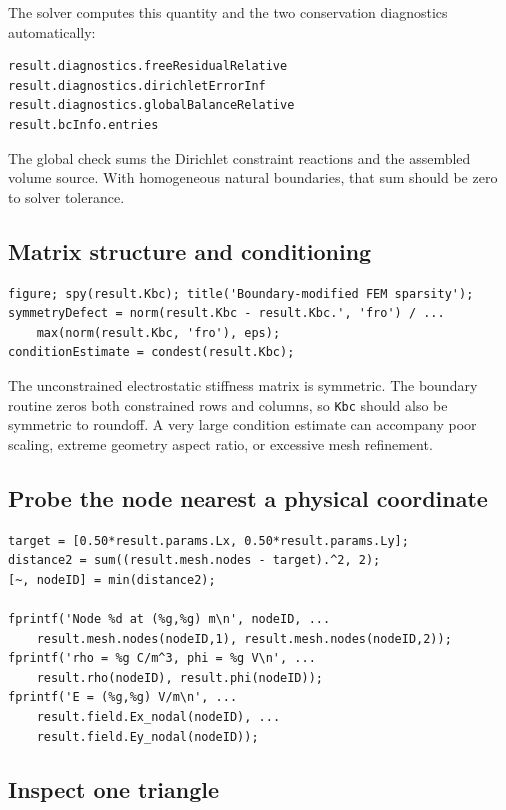 \documentclass[11pt]{article}
\begin{document}
The solver computes this quantity and the two conservation diagnostics automatically:
\begin{lstlisting}[style=projectmatlab]
result.diagnostics.freeResidualRelative
result.diagnostics.dirichletErrorInf
result.diagnostics.globalBalanceRelative
result.bcInfo.entries
\end{lstlisting}
The global check sums the Dirichlet constraint reactions and the assembled volume source. With homogeneous natural boundaries, that sum should be zero to solver tolerance.

\subsection{Matrix structure and conditioning}

\begin{lstlisting}[style=projectmatlab]
figure; spy(result.Kbc); title('Boundary-modified FEM sparsity');
symmetryDefect = norm(result.Kbc - result.Kbc.', 'fro') / ...
    max(norm(result.Kbc, 'fro'), eps);
conditionEstimate = condest(result.Kbc);
\end{lstlisting}
The unconstrained electrostatic stiffness matrix is symmetric. The boundary routine zeros both constrained rows and columns, so \texttt{Kbc} should also be symmetric to roundoff. A very large condition estimate can accompany poor scaling, extreme geometry aspect ratio, or excessive mesh refinement.

\subsection{Probe the node nearest a physical coordinate}

\begin{lstlisting}[style=projectmatlab]
target = [0.50*result.params.Lx, 0.50*result.params.Ly];
distance2 = sum((result.mesh.nodes - target).^2, 2);
[~, nodeID] = min(distance2);

fprintf('Node %d at (%g,%g) m\n', nodeID, ...
    result.mesh.nodes(nodeID,1), result.mesh.nodes(nodeID,2));
fprintf('rho = %g C/m^3, phi = %g V\n', ...
    result.rho(nodeID), result.phi(nodeID));
fprintf('E = (%g,%g) V/m\n', ...
    result.field.Ex_nodal(nodeID), ...
    result.field.Ey_nodal(nodeID));
\end{lstlisting}

\subsection{Inspect one triangle}
\end{document}
